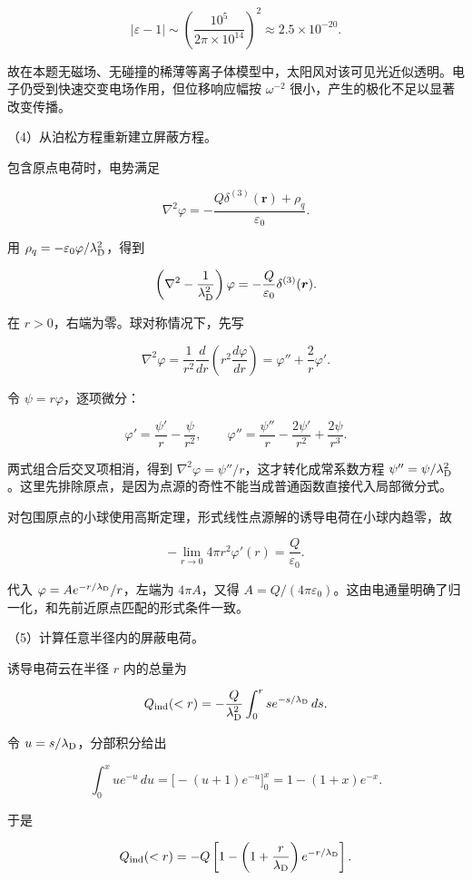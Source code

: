 \documentclass[12pt,a4paper,fontset=fandol]{ctexart}
\begin{document}
\[
\left|\varepsilon-1\right|
\sim\left(\frac{10^5}{2\pi\times10^{14}}\right)^2
\approx2.5\times10^{-20}.
\]

故在本题无磁场、无碰撞的稀薄等离子体模型中，太阳风对该可见光近似透明。电子仍受到快速交变电场作用，但位移响应幅按
\(\omega^{-2}\) 很小，产生的极化不足以显著改变传播。

（4）从泊松方程重新建立屏蔽方程。

包含原点电荷时，电势满足

\[
\nabla^2\varphi
=-\frac{Q\delta^{(3)}(\boldsymbol r)+\rho_q}{\varepsilon_0}.
\]

用 \(\rho_q=-\varepsilon_0\varphi/\lambda_{\rm D}^2\)，得到

\[
\left(\nabla^2-\frac1{\lambda_{\rm D}^2}\right)\varphi
=-\frac Q{\varepsilon_0}\delta^{(3)}(\boldsymbol r).
\]

在 \(r>0\)，右端为零。球对称情况下，先写

\[
\nabla^2\varphi
=\frac1{r^2}\frac d{dr}\left(r^2\frac{d\varphi}{dr}\right)
=\varphi''+\frac2r\varphi'.
\]

令 \(\psi=r\varphi\)，逐项微分：

\[
\varphi'=\frac{\psi'}r-\frac{\psi}{r^2},\qquad
\varphi''=\frac{\psi''}r-\frac{2\psi'}{r^2}
+\frac{2\psi}{r^3}.
\]

两式组合后交叉项相消，得到
\(\nabla^2\varphi=\psi''/r\)，这才转化成常系数方程
\(\psi''=\psi/\lambda_{\rm D}^2\)。这里先排除原点，是因为点源的奇性不能当成普通函数直接代入局部微分式。

对包围原点的小球使用高斯定理，形式线性点源解的诱导电荷在小球内趋零，故

\[
-\lim_{r\to0}4\pi r^2\varphi'(r)=\frac Q{\varepsilon_0}.
\]

代入 \(\varphi=Ae^{-r/\lambda_{\rm D}}/r\)，左端为 \(4\pi A\)，又得
\(A=Q/(4\pi\varepsilon_0)\)。这由电通量明确了归一化，和先前近原点匹配的形式条件一致。

（5）计算任意半径内的屏蔽电荷。

诱导电荷云在半径 \(r\) 内的总量为

\[
Q_{\rm ind}(<r)
=-\frac Q{\lambda_{\rm D}^2}
\int_0^r s e^{-s/\lambda_{\rm D}}\,ds.
\]

令 \(u=s/\lambda_{\rm D}\)，分部积分给出

\[
\int_0^x u e^{-u}\,du
=\big[-(u+1)e^{-u}\big]_0^x
=1-(1+x)e^{-x}.
\]

于是

\[
Q_{\rm ind}(<r)
=-Q\left[1-\left(1+\frac r{\lambda_{\rm D}}\right)
e^{-r/\lambda_{\rm D}}\right].
\]
\end{document}
